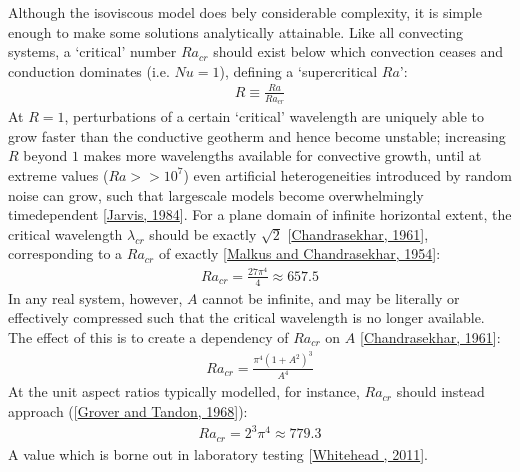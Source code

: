 \documentclass[letterpaper,10pt,english]{jupyterBook}
\begin{document}
\sphinxAtStartPar
Although the isoviscous model does bely considerable complexity, it is simple enough to make some solutions analytically attainable. Like all convecting systems, a ‘critical’  number \(Ra_{cr}\) should exist below which convection ceases and conduction dominates (i.e. \(Nu=1\)), defining a ‘supercritical \(Ra\)’:
\begin{equation*}
\begin{split} R \equiv \frac{Ra}{Ra_{cr}} \end{split}
\end{equation*}
\sphinxAtStartPar
At \(R=1\), perturbations of a certain ‘critical’ wavelength are uniquely able to grow faster than the conductive geotherm and hence become unstable; increasing \(R\) beyond \(1\) makes more wavelengths available for convective growth, until at extreme values (\(Ra >> 10^7\)) even artificial heterogeneities introduced by random noise can grow, such that large\sphinxhyphen{}scale models become overwhelmingly time\sphinxhyphen{}dependent {[}\hyperlink{cite.references:id876}{Jarvis, 1984}{]}. For a plane domain of infinite horizontal extent, the critical wavelength \(\lambda_{cr}\) should be exactly \(\sqrt{2}\) {[}\hyperlink{cite.references:id896}{Chandrasekhar, 1961}{]}, corresponding to a \(Ra_{cr}\) of exactly {[}\hyperlink{cite.references:id805}{Malkus and Chandrasekhar, 1954}{]}:
\begin{equation*}
\begin{split} Ra_{cr} = \frac{27\pi^4}{4} \approx 657.5 \end{split}
\end{equation*}
\sphinxAtStartPar
In any real system, however, \(A\) cannot be infinite, and may be literally or effectively compressed such that the critical wavelength is no longer available. The effect of this is to create a dependency of \(Ra_{cr}\) on \(A\) {[}\hyperlink{cite.references:id896}{Chandrasekhar, 1961}{]}:
\begin{equation*}
\begin{split} Ra_{cr} = \frac{\pi^4 \left( 1 + A^2 \right)^3}{A^4} \end{split}
\end{equation*}
\sphinxAtStartPar
At the unit aspect ratios typically modelled, for instance, \(Ra_{cr}\) should instead approach ({[}\hyperlink{cite.references:id906}{Grover and Tandon, 1968}{]}):
\begin{equation*}
\begin{split} Ra_{cr} = 2^3\pi^4 \approx 779.3 \end{split}
\end{equation*}
\sphinxAtStartPar
A value which is borne out in laboratory testing {[}\hyperlink{cite.references:id907}{Whitehead , 2011}{]}.
\end{document}
